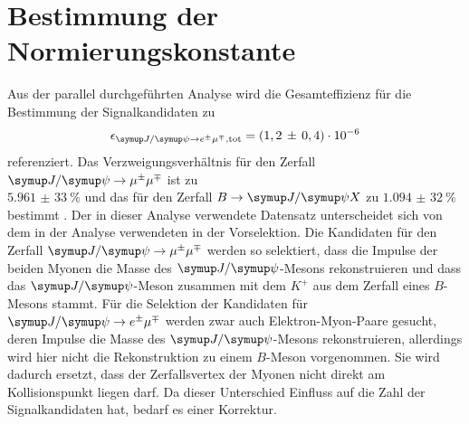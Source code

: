 \section{Bestimmung der Normierungskonstante}
\label{sec:norm}
Aus der parallel durchgeführten Analyse \cite{ba-maik} wird die Gesamteffizienz für die Bestimmung der Signalkandidaten zu
%
\begin{equation}
  \epsilon_{\signal, \text{tot}}=(1,2\,\pm\,0,4)\cdot 10^{-6}
\end{equation}
%
referenziert. Das Verzweigungsverhältnis für den Zerfall $\kontroll$ ist zu \\$\SI{5,961(33)}{\percent}$ und das für den Zerfall $B\rightarrow\jpsi X$ zu $\SI{1,094(32)}{\percent}$ bestimmt \cite{pdg}. Der in
dieser Analyse verwendete Datensatz unterscheidet sich von dem in der Analyse \cite{ba-maik} verwendeten in der Vorselektion. Die
Kandidaten für den Zerfall $\kontroll$ werden so selektiert, dass die Impulse der beiden Myonen die Masse des $\jpsi$-Mesons
rekonstruieren und dass das $\jpsi$-Meson zusammen mit dem $K^+$ aus dem Zerfall eines $B$-Mesons stammt. Für die Selektion der Kandidaten für $\signal$ werden zwar auch Elektron-Myon-Paare gesucht, deren Impulse die Masse des $\jpsi$-Mesons rekonstruieren, allerdings wird
hier nicht die Rekonstruktion zu einem $B$-Meson vorgenommen. Sie wird dadurch ersetzt, dass der Zerfallsvertex der Myonen nicht direkt
am Kollisionspunkt liegen darf. Da dieser Unterschied Einfluss auf die Zahl der Signalkandidaten hat, bedarf es einer Korrektur.
%
